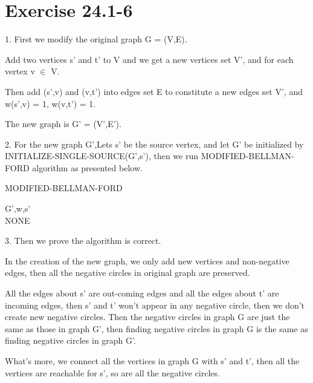 \documentclass[oneside]{homework} %
\begin{document}
\maketitle
\newpage

\section*{Exercise 24.1-6}
1. First we modify the original graph G = (V,E). 

Add two vertices s' and t' to V and we get a new vertices set V', and for each vertex v $\in$ V. 

Then add (s',v) and (v,t') into edges set E to constitute a new edges set V', and w(s',v) = 1, w(v,t') = 1. 

The new graph is G' = (V',E').

2. For the new graph G',Lets s' be the source vertex, and let G' be initialized by INITIALIZE-SINGLE-SOURCE(G',s'), then we run MODIFIED-BELLMAN-FORD algorithm as presented below.
\begin{algorithm}[h]
\caption{MODIFIED-BELLMAN-FORD}
\label{algo:mbf}
\begin{algorithmic}[1]
  \REQUIRE G',w,s' 
  \ENSURE ~ ~\\ 
	\ENDFOR
  \ENDFOR
	\ENDIF
  \ENDFOR
  \ENDWHILE
  \LASTCON NONE	
\end{algorithmic}
\end{algorithm}

3. Then we prove the algorithm is correct.

In the creation of the new graph, we only add new vertices and non-negative edges, then all the negative circles in original graph are preserved. 

All the edges about s' are out-coming edges and all the edges about t' are incoming edges, then s' and t' won't appear in any negative circle, then we don't create new negative circles. Then the negative circles in graph G are just the same as those in graph G', then finding negative circles in graph G is the same as finding negative circles in graph G'.

What's more, we connect all the vertices in graph G with s' and t', then all the vertices are reachable for s', so are all the negative circles.
\end{document}
